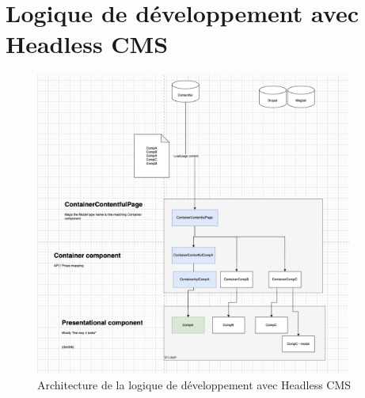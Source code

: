 \section{Logique de développement avec Headless CMS}
\begin{figure}[h] 
  \centering
  \includegraphics[width=0.93\textwidth]{Includes/Images/architecture.png}
  \caption{Architecture de la logique de développement avec Headless CMS}
  \label{fig: Architecture de la logique de développement avec Headless CMS}
\end{figure}

